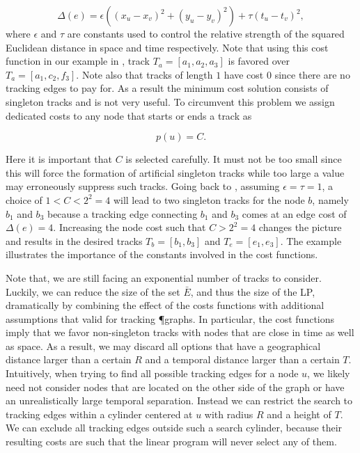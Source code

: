 		\begin{equation}
		\Delta(e) = \epsilon ((x_u - x_v)^2 + (y_u - y_v)^2 ) + \tau (t_u - t_v)^2,
		\end{equation}
		where $\epsilon$ and $\tau$ are constants used to control the relative strength of the squared Euclidean distance in space and time respectively. Note that using this cost function in our example in , track $T_a = [a_1,a_2,a_3]$ is favored over $T_a = [a_1,c_2,f_3]$. Note also that tracks of length $1$ have cost $0$ since there are no tracking edges to pay for. As a result the minimum cost solution consists of singleton tracks and is not very useful. To circumvent this problem we assign dedicated costs to any node that starts or ends a track as

		\begin{equation}
		p(u) = C.
		\end{equation}

		Here it is important that $C$ is selected carefully. It must not be too small since this will force the formation of artificial singleton tracks while too large a value may erroneously suppress such tracks. Going back to , assuming $\epsilon = \tau = 1$, a choice of $ 1 < C < 2^2 = 4$ will lead to two singleton tracks for the node $b$, namely ${b_1}$ and ${b_3}$ because a tracking edge connecting $b_1$ and $b_3$ comes at an edge cost of $\Delta(e)=4$. Increasing the node cost such that $C>2^2 = 4$ changes the picture and results in the desired tracks $T_b = [b_1, b_3]$ and $T_e = [e_1, e_3]$. The example illustrates the importance of the constants involved in the cost functions.

		Note that, we are still facing an exponential number of tracks to consider. Luckily, we can reduce the size of the set $\bar{E}$, and thus the size of the LP, dramatically by combining the effect of the costs functions with additional assumptions that valid for tracking \P graphs. In particular, the cost functions imply that we favor non-singleton tracks with nodes that are close in time as well as space. As a result, we may discard all options that have a geographical distance larger than a certain $R$ and a temporal distance larger than a certain $T$. Intuitively, when trying to find all possible tracking edges for a node $u$, we likely need not consider nodes that are located on the other side of the graph or have an unrealistically large temporal separation. Instead we can restrict the search to tracking edges within a cylinder centered at $u$ with radius $R$ and a height of $T$. We can exclude all tracking edges outside such a search cylinder, because their resulting costs are such that the linear program will never select any of them. 

